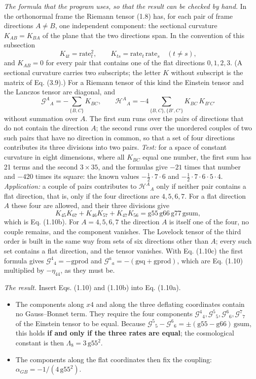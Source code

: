 \documentclass[
  10pt,
]{article}
\providecommand{\tightlist}{%
  \setlength{\itemsep}{0pt}\setlength{\parskip}{0pt}}
\begin{document}
\emph{The formula that the program uses, so that the result can be
checked by hand.} In the orthonormal frame the Riemann tensor (1.8) has,
for each pair of frame directions \(A\neq B\), one independent
component: the sectional curvature \(K_{AB}=K_{BA}\) of the plane that
the two directions span. In the convention of this subsection
\[K_{4t}=\mathrm{rate}_t^2,\qquad K_{ts}=\mathrm{rate}_t\,\mathrm{rate}_s\quad(t\neq s),\tag{1.10c}\]
and \(K_{AB}=0\) for every pair that contains one of the flat directions
\(0,1,2,3\). (A sectional curvature carries two subscripts; the letter
\(K\) without subscript is the matrix of Eq. (3.9).) For a Riemann
tensor of this kind the Einstein tensor and the Lanczos tensor are
diagonal, and \[\mathcal G^A{}_A=-\sum_{\{B,C\}}K_{BC},\qquad
\mathcal H^A{}_A=-4\sum_{\{B,C\},\{B',C'\}}K_{BC}\,K_{B'C'}\tag{1.10d}\]
without summation over \(A\). The first sum runs over the pairs of
directions that do not contain the direction \(A\); the second runs over
the unordered couples of two such pairs that have no direction in
common, so that a set of four directions contributes its three divisions
into two pairs. \emph{Test:} for a space of constant curvature in eight
dimensions, where all \(K_{BC}\) equal one number, the first sum has 21
terms and the second \(3\times35\), and the formulas give \(-21\) times
that number and \(-420\) times its square: the known values
\(-\tfrac12\cdot7\cdot6\) and \(-\tfrac12\cdot7\cdot6\cdot5\cdot4\).
\emph{Application:} a couple of pairs contributes to
\(\mathcal H^A{}_A\) only if neither pair contains a flat direction,
that is, only if the four directions are \(4,5,6,7\). For a flat
direction \(A\) these four are allowed, and their three divisions give
\[K_{45}K_{67}+K_{46}K_{57}+K_{47}K_{56}=\mathrm{g55}\,\mathrm{g66}\,\mathrm{g77}\,\mathrm{gsum},\]
which is Eq. (1.10b). For \(A=4,5,6,7\) the direction \(A\) is itself
one of the four, no couple remains, and the component vanishes. The
Lovelock tensor of the third order is built in the same way from sets of
six directions other than \(A\); every such set contains a flat
direction, and the tensor vanishes. With Eq. (1.10c) the first formula
gives \(\mathcal G^4{}_4=-\mathrm{gprod}\) and
\(\mathcal G^a{}_a=-(\mathrm{gsq}+\mathrm{gprod})\), which are Eq.
(1.10) multiplied by \(-\eta_{44}\), as they must be.

\emph{The result.} Insert Eqs. (1.10) and (1.10b) into Eq. (1.10a).

\begin{itemize}
\tightlist
\item
  The components along \(x4\) and along the three deflating coordinates
  contain no Gauss--Bonnet term. They require the four components
  \(\mathcal G^4{}_4,\mathcal G^5{}_5,\mathcal G^6{}_6,\mathcal G^7{}_7\)
  of the Einstein tensor to be equal. Because
  \(\mathcal G^5{}_5-\mathcal G^6{}_6=\pm(\mathrm{g55}-\mathrm{g66})\,\mathrm{gsum}\),
  this holds \textbf{if and only if the three rates are equal}; the
  cosmological constant is then \(\Lambda_8=3\,\mathrm{g55}^2\).
\item
  The components along the flat coordinates then fix the coupling:
  \(\alpha_{GB}=-1/(4\,\mathrm{g55}^2)\).
\end{itemize}
\end{document}
